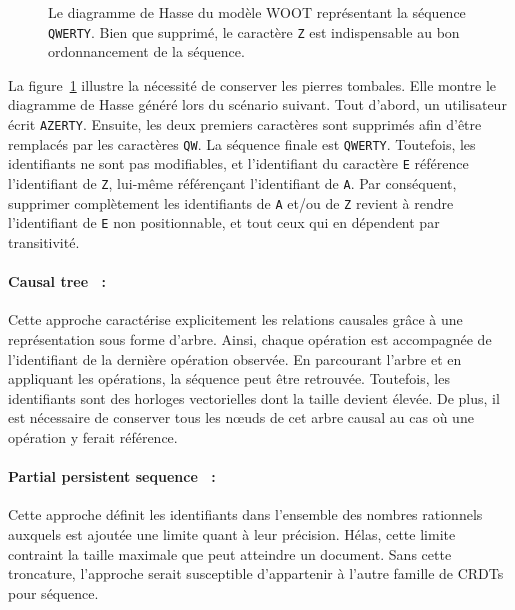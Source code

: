 \begin{figure}
  \centering
  
  \caption[Diagramme de Hasse dans WOOT]
  {\label{repl:fig:wootexample}Le diagramme de Hasse du modèle WOOT représentant
    la séquence \texttt{QWERTY}. Bien que supprimé, le caractère \texttt{Z} est
    indispensable au bon ordonnancement de la séquence.}
\end{figure}

\noindent La figure~\ref{repl:fig:wootexample} illustre la nécessité de
conserver les pierres tombales. Elle montre le diagramme de Hasse généré lors du
scénario suivant. Tout d'abord, un utilisateur écrit \texttt{AZERTY}. Ensuite,
les deux premiers caractères sont supprimés afin d'être remplacés par les
caractères \texttt{QW}. La séquence finale est \texttt{QWERTY}. Toutefois, les
identifiants ne sont pas modifiables, et l'identifiant du caractère \texttt{E}
référence l'identifiant de \texttt{Z}, lui-même référençant l'identifiant de
\texttt{A}. Par conséquent, supprimer complètement les identifiants de
\texttt{A} et/ou de \texttt{Z} revient à rendre l'identifiant de \texttt{E} non
positionnable, et tout ceux qui en dépendent par transitivité.

\paragraph{Causal tree~\cite{grishchenko2010deep} :} Cette approche caractérise
explicitement les relations causales grâce à une représentation sous forme
d'arbre. Ainsi, chaque opération est accompagnée de l'identifiant de la dernière
opération observée. En parcourant l'arbre et en appliquant les opérations, la
séquence peut être retrouvée. Toutefois, les identifiants sont des horloges
vectorielles dont la taille devient élevée. De plus, il est nécessaire de
conserver tous les nœuds de cet arbre causal au cas où une opération y ferait
référence.

\paragraph{Partial persistent sequence~\cite{wu2010partial} :} Cette approche
définit les identifiants dans l'ensemble des nombres rationnels auxquels est
ajoutée une limite quant à leur précision. Hélas, cette limite contraint la
taille maximale que peut atteindre un document. Sans cette troncature,
l'approche serait susceptible d'appartenir à l'autre famille de CRDTs pour
séquence.

